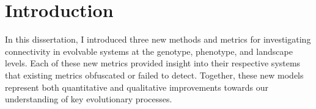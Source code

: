 \section{Introduction}

In this dissertation, I introduced three new methods and metrics for investigating connectivity in evolvable systems at the genotype, phenotype, and landscape levels. 
Each of these new metrics provided insight into their respective systems that existing metrics obfuscated or failed to detect. 
Together, these new models represent both quantitative and qualitative improvements towards our understanding of key evolutionary processes.